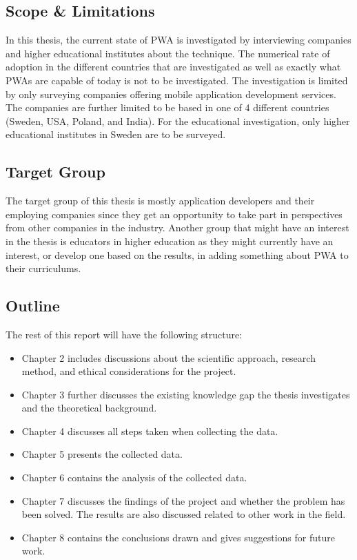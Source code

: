 \documentclass[a4paper,12pt]{article}
\begin{document}
\subsection{Scope \& Limitations}
In this thesis, the current state of PWA is investigated by interviewing companies and higher educational institutes about the technique. The numerical rate of adoption in the different countries that are investigated as well as exactly what PWAs are capable of today is not to be investigated.
The investigation is limited by only surveying companies offering mobile application development services. The companies are further limited to be based in one of 4 different countries  (Sweden, USA, Poland, and India). For the educational investigation, only higher educational institutes in Sweden are to be surveyed.

\subsection{Target Group}
The target group of this thesis is mostly application developers and their employing companies since they get an opportunity to take part in perspectives from other companies in the industry. Another group that might have an interest in the thesis is educators in higher education as they might currently have an interest, or develop one based on the results, in adding something about PWA to their curriculums.

\subsection{Outline}
The rest of this report will have the following structure:
\begin{itemize}
    \item Chapter 2 includes discussions about the scientific approach, research method, and ethical considerations for the project.
    \item Chapter 3 further discusses the existing knowledge gap the thesis investigates and the theoretical background.
    \item Chapter 4 discusses all steps taken when collecting the data.
    \item Chapter 5 presents the collected data.
    \item Chapter 6 contains the analysis of the collected data.
    \item Chapter 7 discusses the findings of the project and whether the problem has been solved. The results are also discussed related to other work in the field.
    \item Chapter 8 contains the conclusions drawn and gives suggestions for future work.
\end{itemize}
\end{document}
